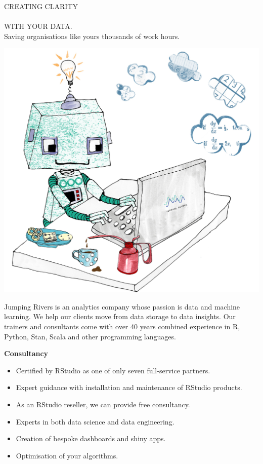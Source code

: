 {\huge CREATING CLARITY \\ \\ WITH YOUR DATA.}
\\

{\large Saving organisations like yours thousands of work hours.}
\vspace{1cm}

\includegraphics[width=.8\textwidth]{robot.jpg}

Jumping Rivers is an analytics company whose passion is data and machine learning. We help our clients move from data storage to data insights. Our trainers and consultants come with over 40 years combined experience in R, Python, Stan, Scala and other programming languages. \\



\textbf {Consultancy}
\begin{itemize}
\item Certified by RStudio as one of only seven full-service partners.
\item Expert guidance with installation and maintenance of RStudio products.
\item As an RStudio reseller, we can provide free consultancy.
\item Experts in both data science and data engineering.
\item Creation of bespoke dashboards and shiny apps.
\item Optimisation of your algorithms.
\end{itemize}

